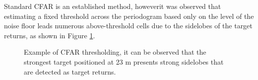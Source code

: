 Standard CFAR is an established method, howeverit was observed that estimating a fixed threshold across the periodogram based only on the level of the noise floor leads numerous above-threshold cells due to the sidelobes of the target returns, as shown in Figure \ref{fig:RadThesh_CFAR_abv_thresh_doubl}.

	\begin{figure}[H]
	\centering
	
	\hfill
	
	\caption[]{Example of CFAR thresholding, it can be observed that the strongest target positioned at 23 m presents strong sidelobes that are detected as target returns.}
	\label{fig:RadThesh_CFAR_abv_thresh_doubl}
\end{figure}


